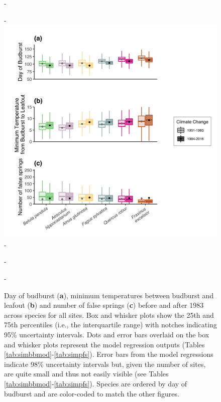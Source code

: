 \documentclass{article}\usepackage[]{graphicx}\usepackage[]{color}
\begin{document}
{\begin{figure} [H]
  -\begin{center}
  -\includegraphics[width=14cm]{..//analyses/figures/Boxplot_BBTminFS_noDots_modests.png}
  -\caption{Day of budburst (\textbf{a}), minimum temperatures between budburst and leafout (\textbf{b}) and number of false springs (\textbf{c}) before and after 1983 across species for all sites. Box and whisker plots show the 25th and 75th percentiles (i.e., the interquartile range) with notches indicating 95\% uncertainty intervals. Dots and error bars overlaid on the box and whisker plots represent the model regression outputs (Tables \ref{tab:simbbmod}-\ref{tab:simpfs}). Error bars from the model regressions indicate 98\% uncertainty intervals but, given the number of sites, are quite small and thus not easily visible (see Tables \ref{tab:simbbmod}-\ref{tab:simpfs}). Species are ordered by day of budburst and are color-coded to match the other figures.  }\label{fig:boxfs}
  -\end{center}
  -\end{figure}}
  
\end{document}
